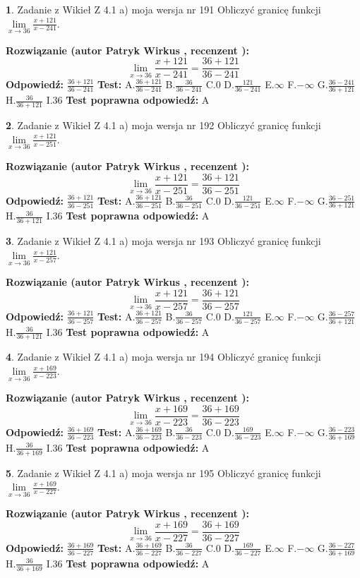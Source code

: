 \documentclass[12pt, a4paper]{article}
\theoremstyle{definition} %
\newtheorem{zad}{}
\newcommand{\zadStart}[1]{\begin{zad}#1\newline}
\newcommand{\zadStop}{\end{zad}}
\newcommand{\rozwStart}[2]{\noindent \textbf{Rozwiązanie (autor #1 , recenzent #2): }\newline}
\newcommand{\rozwStop}{\newline}
\newcommand{\odpStart}{\noindent \textbf{Odpowiedź:}\newline}
\newcommand{\odpStop}{\newline}
\newcommand{\testStart}{\noindent \textbf{Test:}\newline}
\newcommand{\testStop}{\newline}
\newcommand{\kluczStart}{\noindent \textbf{Test poprawna odpowiedź:}\newline}
\newcommand{\kluczStop}{\newline}
\begin{document}
\zadStart{Zadanie z Wikieł Z 4.1 a) moja wersja nr 191}
Obliczyć granicę funkcji $\lim\limits_{x\to36}\frac{x+121}{x-241}$.
\zadStop
\rozwStart{Patryk Wirkus}{}
$$\lim\limits_{x\to36}\frac{x+121}{x-241} = \frac{36+121}{36-241}$$
\rozwStop
\odpStart
$\frac{36+121}{36-241}$
\odpStop
\testStart
A.$\frac{36+121}{36-241}$
B.$\frac{36}{36-241}$
C.$0$
D.$\frac{121}{36-241}$
E.$\infty$
F.$-\infty$
G.$\frac{36-241}{36+121}$
H.$\frac{36}{36+121}$
I.$36$
\testStop
\kluczStart
A
\kluczStop



\zadStart{Zadanie z Wikieł Z 4.1 a) moja wersja nr 192}
Obliczyć granicę funkcji $\lim\limits_{x\to36}\frac{x+121}{x-251}$.
\zadStop
\rozwStart{Patryk Wirkus}{}
$$\lim\limits_{x\to36}\frac{x+121}{x-251} = \frac{36+121}{36-251}$$
\rozwStop
\odpStart
$\frac{36+121}{36-251}$
\odpStop
\testStart
A.$\frac{36+121}{36-251}$
B.$\frac{36}{36-251}$
C.$0$
D.$\frac{121}{36-251}$
E.$\infty$
F.$-\infty$
G.$\frac{36-251}{36+121}$
H.$\frac{36}{36+121}$
I.$36$
\testStop
\kluczStart
A
\kluczStop



\zadStart{Zadanie z Wikieł Z 4.1 a) moja wersja nr 193}
Obliczyć granicę funkcji $\lim\limits_{x\to36}\frac{x+121}{x-257}$.
\zadStop
\rozwStart{Patryk Wirkus}{}
$$\lim\limits_{x\to36}\frac{x+121}{x-257} = \frac{36+121}{36-257}$$
\rozwStop
\odpStart
$\frac{36+121}{36-257}$
\odpStop
\testStart
A.$\frac{36+121}{36-257}$
B.$\frac{36}{36-257}$
C.$0$
D.$\frac{121}{36-257}$
E.$\infty$
F.$-\infty$
G.$\frac{36-257}{36+121}$
H.$\frac{36}{36+121}$
I.$36$
\testStop
\kluczStart
A
\kluczStop



\zadStart{Zadanie z Wikieł Z 4.1 a) moja wersja nr 194}
Obliczyć granicę funkcji $\lim\limits_{x\to36}\frac{x+169}{x-223}$.
\zadStop
\rozwStart{Patryk Wirkus}{}
$$\lim\limits_{x\to36}\frac{x+169}{x-223} = \frac{36+169}{36-223}$$
\rozwStop
\odpStart
$\frac{36+169}{36-223}$
\odpStop
\testStart
A.$\frac{36+169}{36-223}$
B.$\frac{36}{36-223}$
C.$0$
D.$\frac{169}{36-223}$
E.$\infty$
F.$-\infty$
G.$\frac{36-223}{36+169}$
H.$\frac{36}{36+169}$
I.$36$
\testStop
\kluczStart
A
\kluczStop



\zadStart{Zadanie z Wikieł Z 4.1 a) moja wersja nr 195}
Obliczyć granicę funkcji $\lim\limits_{x\to36}\frac{x+169}{x-227}$.
\zadStop
\rozwStart{Patryk Wirkus}{}
$$\lim\limits_{x\to36}\frac{x+169}{x-227} = \frac{36+169}{36-227}$$
\rozwStop
\odpStart
$\frac{36+169}{36-227}$
\odpStop
\testStart
A.$\frac{36+169}{36-227}$
B.$\frac{36}{36-227}$
C.$0$
D.$\frac{169}{36-227}$
E.$\infty$
F.$-\infty$
G.$\frac{36-227}{36+169}$
H.$\frac{36}{36+169}$
I.$36$
\testStop
\kluczStart
A
\kluczStop
\end{document}
